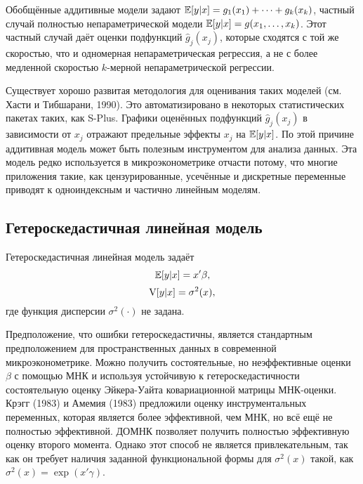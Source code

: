 Обобщённые аддитивные модели задают $\mathbb{E}[y|x] = g_1(x_1) + \cdots + g_k(x_k)$, частный случай полностью непараметрической модели $\mathbb{E}[y|x] = g(x_1, \dots, x_k)$. Этот частный случай даёт оценки подфункций $\hat{g}_j(x_j)$, которые сходятся с той же скоростью, что и одномерная непараметрическая регрессия, а не с более медленной скоростью $k$-мерной непараметрической регрессии. 

Существует хорошо развитая методология для оценивания таких моделей (см. Хасти и Тибшарани, 1990). Это автоматизировано в некоторых статистических пакетах таких, как S-Plus. Графики оценённых подфункций $\hat{g}_j(x_j)$ в зависимости от $x_j$ отражают предельные эффекты $x_j$ на $\mathbb{E}[y|x]$. По этой причине аддитивная модель может быть полезным инструментом для анализа данных. Эта модель редко используется в микроэконометрике отчасти потому, что многие приложения такие, как цензурированные, усечённые и дискретные переменные приводят к одноиндексным и частично линейным моделям.

\subsection{Гетероскедастичная линейная модель}

Гетероскедастичная линейная модель задаёт 
\[
\mathbb{E}[y|x] = x'\beta,
\]
\[
\mathrm{V}[y|x] = \sigma^2(x),
\]
где функция дисперсии $\sigma^2(\cdot)$ не задана.

Предположение, что ошибки гетероскедастичны, является стандартным предположением для пространственных данных в современной микроэконометрике. Можно получить состоятельные, но неэффективные оценки $\beta$ с помощью МНК и используя устойчивую к гетероскедастичности состоятельную оценку Эйкера-Уайта ковариационной матрицы МНК-оценки. Крэгг (1983) и Амемия (1983) предложили оценку инструментальных переменных, которая является более эффективной, чем МНК, но всё ещё не полностью эффективной. ДОМНК позволяет получить полностью эффективную оценку второго момента. Однако этот способ не является привлекательным, так как он требует наличия заданной функциональной формы для $\sigma^2(x)$ такой, как $\sigma^2(x) = \exp(x'\gamma)$.

